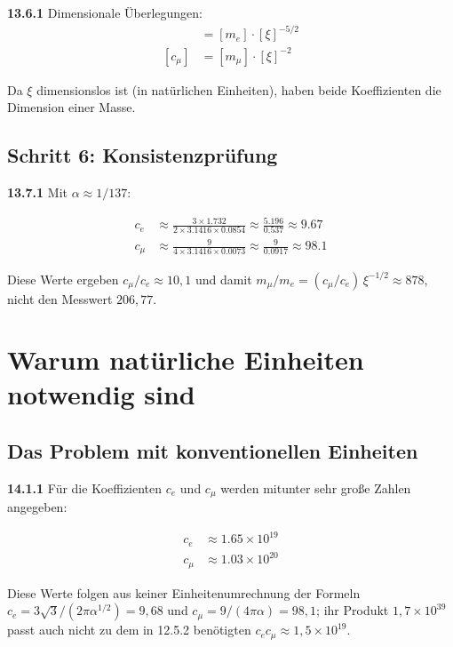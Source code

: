 \noindent \textbf{13.6.1} Dimensionale Überlegungen:
\begin{align*}
	[c_e] &= [m_e] \cdot [\xi]^{-5/2} \\
	[c_\mu] &= [m_\mu] \cdot [\xi]^{-2}
\end{align*}

Da $\xi$ dimensionslos ist (in natürlichen Einheiten), haben beide Koeffizienten die Dimension einer Masse.

\subsection{Schritt 6: Konsistenzprüfung}

\noindent \textbf{13.7.1} Mit $\alpha \approx 1/137$:

\begin{align*}
	c_e &\approx \frac{3 \times 1.732}{2 \times 3.1416 \times 0.0854} \approx \frac{5.196}{0.537} \approx 9.67 \\
	c_\mu &\approx \frac{9}{4 \times 3.1416 \times 0.0073} \approx \frac{9}{0.0917} \approx 98.1
\end{align*}

Diese Werte ergeben $c_\mu/c_e \approx 10{,}1$ und damit $m_\mu/m_e = (c_\mu/c_e)\,\xi^{-1/2} \approx 878$, nicht den Messwert $206{,}77$.

\section{Warum natürliche Einheiten notwendig sind}

\subsection{Das Problem mit konventionellen Einheiten}

\noindent \textbf{14.1.1} Für die Koeffizienten $c_e$ und $c_\mu$ werden mitunter sehr große Zahlen angegeben:

\begin{align*}
	c_e &\approx 1.65 \times 10^{19} \\
	c_\mu &\approx 1.03 \times 10^{20}
\end{align*}

Diese Werte folgen aus keiner Einheitenumrechnung der Formeln $c_e = 3\sqrt3/(2\pi\alpha^{1/2}) = 9{,}68$ und $c_\mu = 9/(4\pi\alpha) = 98{,}1$; ihr Produkt $1{,}7\times10^{39}$ passt auch nicht zu dem in 12.5.2 benötigten $c_e c_\mu \approx 1{,}5\times10^{19}$.

